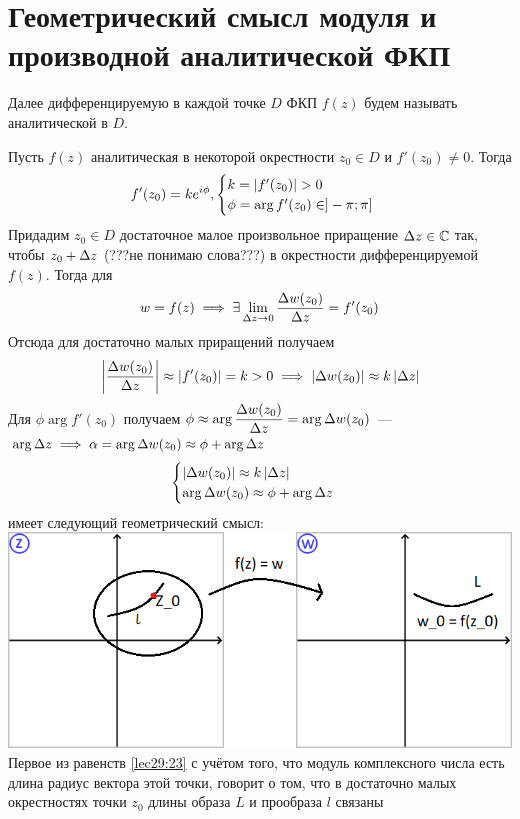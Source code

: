 \documentclass[../../main.tex]{subfiles}
\begin{document}
\section{Геометрический смысл модуля и производной аналитической ФКП}

Далее дифференцируемую в каждой точке $ D $ ФКП $ f(z) $
будем называть аналитической в $ D $.

Пусть $ f(z) $ аналитическая в некоторой окрестности $ z_0 \in D $ и 
$ f'(z_0) \neq 0 $. Тогда
\[
f'(z_0) = k e^{i\phi},
\begin{cases}
	k = \left|{f'(z_0)}\right| > 0\\
	\phi = \arg f'(z_0) \in ]-\pi; \pi]
\end{cases}
\]
Придадим $ z_0 \in D $ достаточное малое произвольное приращение 
$ \Delta z \in \mathbb{C} $ так, чтобы $ z_0 + \Delta z $ (???не понимаю слова???) в 
окрестности
дифференцируемой $ f(z) $. Тогда для
\[
w = f(z) \implies \exists \lim\limits_{\Delta z \to 0} 
\dfrac{\Delta w(z_0)}{\Delta z} = f'(z_0)
\]
Отсюда для достаточно малых приращений получаем
\[
\left|{\dfrac{\Delta w(z_0)}{\Delta z}}\right| \approx \left|{f'(z_0)}\right| = k > 0
\implies \left|{\Delta w(z_0)}\right| \approx k\left|{\Delta z}\right|
\]
Для $ \phi \arg f'(z_0) $ получаем $ \phi \approx \arg 
\dfrac{\Delta w(z_0)}{\Delta z} = \arg \Delta w(z_0)  $~---$ \arg \Delta z \implies
\alpha = \arg \Delta w(z_0) \approx \phi + \arg \Delta z
$
\begin{equation}
\label{lec29:23}
\begin{cases}
	\left|{\Delta w (z_0)}\right| \approx k\left|{\Delta z}\right|\\
	\arg \Delta w(z_0) \approx \phi + \arg \Delta z
\end{cases}
\end{equation}
имеет следующий геометрический смысл:\\
\includegraphics{lec29_1}\\
Первое из равенств \eqref{lec29:23} с учётом того, что модуль комплексного 
числа
есть длина радиус вектора этой точки, говорит о том, что в достаточно 
малых окрестностях точки $ z_0 $ длины образа $ L $ и прообраза $ l $ связаны 
\end{document}

